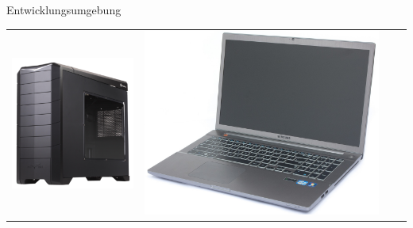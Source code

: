 \begin{frame}{Entwicklungsumgebung}
\onetoone
{
	\begin{table}[h]
	\begin{tabular}{c|c|c|c}
		\includegraphics[width=\textwidth, height=0.1\textheight, keepaspectratio]{images/tower} &
		\includegraphics[width=\textwidth, height=0.1\textheight, keepaspectratio]{images/laptops} &

\end{tabular}
\end{table}}
\end{frame}

